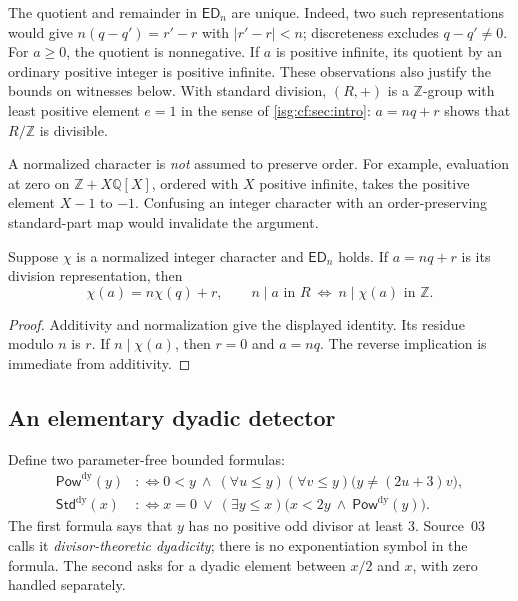 \documentclass[11pt]{article}
\theoremstyle{definition}
\theoremstyle{remark}
\newcommand{\Z}{\mathbb{Z}}
\newcommand{\Q}{\mathbb{Q}}
\newcommand{\PowDy}{\mathsf{Pow}^{\mathrm{dy}}}
\newcommand{\StdDy}{\mathsf{Std}^{\mathrm{dy}}}
\newcommand{\ED}{\mathsf{ED}}
\begin{document}
The quotient and remainder in $\ED_n$ are unique. Indeed, two such
representations would give $n(q-q')=r'-r$ with $|r'-r|<n$; discreteness
excludes $q-q'\ne0$. For $a\ge0$, the quotient is nonnegative. If $a$ is
positive infinite, its quotient by an ordinary positive integer is
positive infinite. These observations also justify the bounds on
witnesses below. With standard division, $(R,+)$ is a $\Z$-group with
least positive element $e=1$ in the sense of \cref{isg:cf:sec:intro}:
$a=nq+r$ shows that $R/\Z$ is divisible.

A normalized character is \emph{not} assumed to preserve order. For
example, evaluation at zero on $\Z+X\Q[X]$, ordered with $X$ positive
infinite, takes the positive element $X-1$ to $-1$. Confusing an integer
character with an order-preserving standard-part map would invalidate the
argument.

\begin{lemma}\label{isg:sc:lem:residue}
Suppose $\chi$ is a normalized integer character and $\ED_n$ holds. If
$a=nq+r$ is its division representation, then
\[
 \chi(a)=n\chi(q)+r,
 \qquad n\mid a\text{ in }R\ \Longleftrightarrow\ n\mid\chi(a)\text{ in }\Z.
\]
\end{lemma}
\begin{proof}
Additivity and normalization give the displayed identity. Its residue
modulo $n$ is $r$. If $n\mid\chi(a)$, then $r=0$ and $a=nq$. The reverse
implication is immediate from additivity.
\end{proof}

\subsection{An elementary dyadic detector}\label{isg:sc:sec:dyadic}
Define two parameter-free bounded formulas:
\begin{align}
 \PowDy(y)&:\Longleftrightarrow
 0<y\ \wedge\ (\forall u\le y)(\forall v\le y)
                \bigl(y\ne(2u+3)v\bigr),\label{isg:sc:eq:power}\\
 \StdDy(x)&:\Longleftrightarrow
 x=0\ \vee\ (\exists y\le x)
               \bigl(x<2y\ \wedge\ \PowDy(y)\bigr).\label{isg:sc:eq:standard}
\end{align}
The first formula says that $y$ has no positive odd divisor at least $3$.
Source~03 calls it \emph{divisor-theoretic dyadicity}; there is no
exponentiation symbol in the formula. The second asks for a dyadic element
between $x/2$ and $x$, with zero handled separately.
\end{document}
